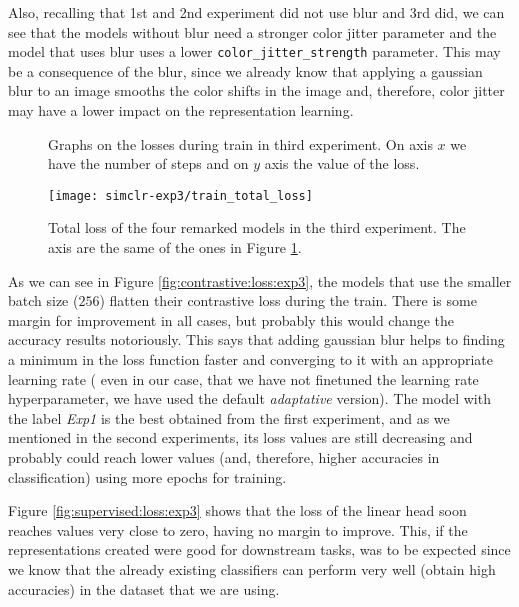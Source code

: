Also, recalling that 1st and 2nd experiment did not use blur and 3rd did, we can see that the models without blur need a stronger color jitter parameter and the model that uses blur uses a lower \lstinline{color_jitter_strength} parameter. This may be a consequence of the blur, since we already know that applying a gaussian blur to an image smooths the color shifts in the image and, therefore, color jitter may have a lower impact on the representation learning.


\begin{figure}[htp] 
    \centering
    \hfill%
        \caption{Graphs on the losses during train in third experiment. On axis $x$ we have the number of steps and on $y$ axis the value of the loss.}
        \label{fig:exp3:both:losses}
\end{figure}

\begin{figure}[H]
    \centering
    \texttt{[image: simclr-exp3/train\_total\_loss]}%
    \caption{Total loss of the four remarked models in the third experiment. The axis are the same of the ones in Figure \ref{fig:exp3:both:losses}. }
    \label{fig:total:loss:exp3}%
    \end{figure}

As we can see in Figure \ref{fig:contrastive:loss:exp3}, the models that use the smaller batch size ($256$) flatten their contrastive loss during the train. There is some margin for improvement in all cases, but probably this would change the accuracy results notoriously. This says that adding gaussian blur helps to finding a minimum in the loss function faster and converging to it with an appropriate learning rate ( even in our case, that we have not finetuned the learning rate hyperparameter, we have used the default \emph{adaptative} version). The model with the label \emph{Exp1} is the best obtained from the first experiment, and as we mentioned in the second experiments, its loss values are still decreasing and probably could reach lower values (and, therefore, higher accuracies in classification) using more epochs for training.

Figure \ref{fig:supervised:loss:exp3} shows that the loss of the linear head soon reaches values very close to zero, having no margin to improve. This, if the representations created were good for downstream tasks, was to be expected since we know that the already existing  classifiers can perform very well (obtain high accuracies) in the dataset that we are using.

